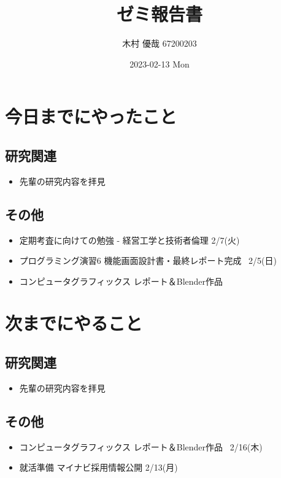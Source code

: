 \documentclass[uplatex, onecolumn, 10pt]{jsarticle}
\begin{document}
\title{\vspace{-40mm}\bf{\LARGE{ゼミ報告書}}}
\author{\vspace{-40mm}木村 優哉 67200203}
\date{2023-02-13 Mon}
\maketitle


\section{今日までにやったこと}

\subsection*{研究関連}
\begin{itemize}
	\item 先輩の研究内容を拝見
\end{itemize}

\subsection*{その他}
\begin{itemize}
	\item 定期考査に向けての勉強 - 経営工学と技術者倫理 2/7(火)
	\item プログラミング演習6 機能画面設計書・最終レポート完成 ~2/5(日)
	\item コンピュータグラフィックス レポート＆Blender作品
\end{itemize}


\section{次までにやること}

\subsection*{研究関連}
\begin{itemize}
	\item 先輩の研究内容を拝見
\end{itemize}

\subsection*{その他}
\begin{itemize}
	\item コンピュータグラフィックス レポート＆Blender作品 ~2/16(木)
	\item 就活準備 マイナビ採用情報公開 2/13(月)
\end{itemize}
\end{document}
